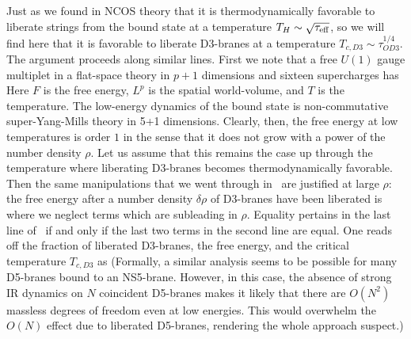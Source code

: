 Just as we found in NCOS theory that it is thermodynamically favorable
to liberate strings from the bound state at a temperature $T_H \sim
\sqrt{\tau_{\rm eff}}$, so we will find here that it is favorable to
liberate D3-branes at a temperature $T_{c,D3} \sim \tau_{OD3}^{1/4}$.
The argument proceeds along similar lines.  First we note that a free
$U(1)$ gauge multiplet in a flat-space theory in $p+1$ dimensions and
sixteen supercharges has
 Here $F$ is the free energy, $L^p$ is the spatial world-volume, and
$T$ is the temperature.  The low-energy dynamics of the bound state is
non-commutative super-Yang-Mills theory in 5+1 dimensions.  Clearly,
then, the free energy at low temperatures is order $1$ in the sense
that it does not grow with a power of the number density $\rho$.  Let
us assume that this remains the case up through the temperature where
liberating D3-branes becomes thermodynamically favorable.  Then the
same manipulations that we went through in \FkForm\ are justified at
large $\rho$: the free energy after a number density $\delta\rho$ of
D3-branes have been liberated is
 where we neglect terms which are subleading in $\rho$.  Equality
pertains in the last line of \FrhoForm\ if and only if the last two
terms in the second line are equal.  One reads off the fraction of
liberated D3-branes, the free energy, and the critical temperature
$T_{c,D3}$ as
 (Formally, a similar analysis seems to be possible for many D5-branes
bound to an NS5-brane.  However, in this case, the absence of strong
IR dynamics on $N$ coincident D5-branes makes it likely that there are
$O(N^2)$ massless degrees of freedom even at low energies.  This would
overwhelm the $O(N)$ effect due to liberated D5-branes, rendering the
whole approach suspect.)

